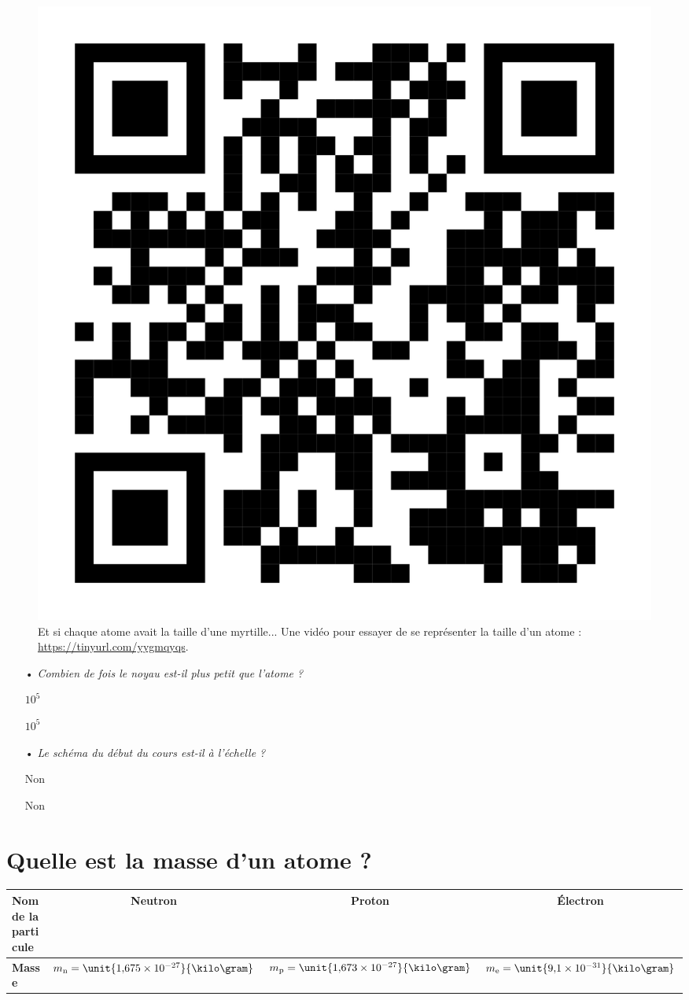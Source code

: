 \documentclass[12pt,a4paper]{article}
\begin{document}
\begin{figure}[h]
\center
\includegraphics[scale=0.03]{images/qr_how_small_atoms_are.png}
\caption{Et si chaque atome avait la taille d'une myrtille... Une vidéo pour essayer de se représenter la taille d'un atome : \href{https://tinyurl.com/yygmqyqs}{https://tinyurl.com/yygmqyqs}.}
\end{figure}

\begin{itemize}
\item[•] \emph{Combien de fois le noyau est-il plus petit que l'atome ?}

{\color{white} $10^5$}

{\color{white} $10^5$}

\item[•] \emph{Le schéma du début du cours est-il à l'échelle ?}

{\color{white} Non}

{\color{white} Non}

\end{itemize}

\section{Quelle est la masse d'un atome ?}

\begin{center}
\begin{tabular}{l|c|c|c}
\textbf{Nom de la particule} & Neutron & Proton & Électron \\
\hline
\textbf{Masse} & $m_\mathrm{n} = \unit{1{,}675\times 10^{-27}}{\kilo\gram}$  & $m_\mathrm{p} = \unit{1{,}673\times 10^{-27}}{\kilo\gram}$ & $m_\mathrm{e} = \unit{9{,}1\times 10^{-31}}{\kilo\gram}$
\end{tabular}

\vspace{\baselineskip} \vspace{\baselineskip}


\end{center}
\end{document}
